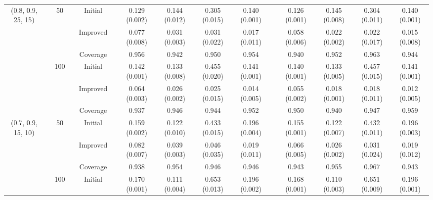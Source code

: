 \documentclass[12pt]{article}
\newcommand{\0}{{\bf 0}}
\begin{document}
\begin{table}[tbp]
\begin{center}
{\begin{tabular}{ccccccccccccccc}
(0.8, 0.9, 25, 15)                         &  & 50                   &  & Initial           &  & 0.129 (0.002) & 0.144 (0.012) & 0.305 (0.015) & 0.140 (0.001)  &  & 0.126 (0.001) & 0.145 (0.008) & 0.304 (0.011) & 0.140 (0.001)  \\
                                           &  &                      &  & Improved          &  & 0.077 (0.008) & 0.031 (0.003) & 0.031 (0.022) & 0.017 (0.011) &  & 0.058 (0.006) & 0.022 (0.002) & 0.022 (0.017) & 0.015 (0.008) \\
                                           &  &                      &  & Coverage          &  & 0.956         & 0.942         & 0.950          & 0.954         &  & 0.940          & 0.952         & 0.963         & 0.944         \\
                                           &  & 100                  &  & Initial           &  & 0.142 (0.001) & 0.133 (0.008) & 0.455 (0.020)  & 0.141 (0.001) &  & 0.140 (0.001)  & 0.133 (0.005) & 0.457 (0.015) & 0.141 (0.001) \\
                                           &  &                      &  & Improved          &  & 0.064 (0.003) & 0.026 (0.002) & 0.025 (0.015) & 0.014 (0.005) &  & 0.055 (0.002) & 0.018 (0.001) & 0.018 (0.011) & 0.012 (0.005) \\
                                           &  &                      &  & Coverage          &  & 0.937         & 0.946         & 0.944         & 0.952         &  & 0.950          & 0.940          & 0.947         & 0.959         \\ \hline
(0.7, 0.9, 15, 10)                         &  & 50                   &  & Initial           &  & 0.159 (0.002) & 0.122 (0.010)  & 0.433 (0.015) & 0.196 (0.004) &  & 0.155 (0.001) & 0.122 (0.007) & 0.432 (0.011) & 0.196 (0.003) \\
                                           &  &                      &  & Improved          &  & 0.082 (0.007) & 0.039 (0.003) & 0.046 (0.035) & 0.019 (0.011) &  & 0.066 (0.005) & 0.026 (0.002) & 0.031 (0.024) & 0.019 (0.012) \\
                                           &  &                      &  & Coverage          &  & 0.938         & 0.954         & 0.946         & 0.946         &  & 0.943         & 0.955         & 0.967         & 0.943         \\
                                           &  & 100                  &  & Initial           &  & 0.170 (0.001)  & 0.111 (0.004) & 0.653 (0.013) & 0.196 (0.002) &  & 0.168 (0.001) & 0.110 (0.003)  & 0.651 (0.009) & 0.196 (0.001) \\

\end{tabular}}
\end{center}
\end{table}
\end{document}
